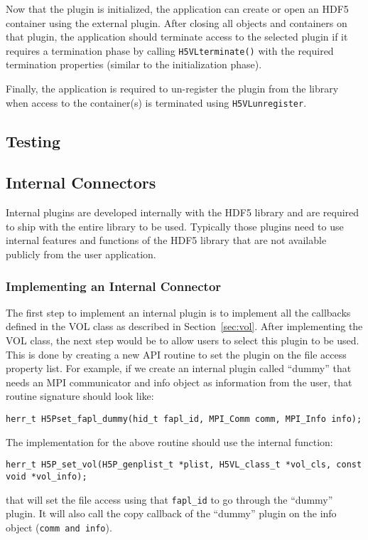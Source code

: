 Now that the plugin is initialized, the application can create or open an HDF5 container using the external plugin. After closing all objects and containers on that plugin, the application should terminate access to the selected plugin if it requires a termination phase by calling {\tt H5VLterminate()} with the required termination properties (similar to the initialization phase). 

Finally, the application is required to un-register the plugin from the library when access to the container(s) is terminated using {\tt H5VLunregister}.

\subsection{Testing}

\subsection{Internal Connectors}

Internal plugins are developed internally with the HDF5 library and
are required to ship with the entire library to be used. Typically
those plugins need to use internal features and functions of the HDF5
library that are not available publicly from the user application.

\subsubsection{Implementing an Internal Connector}
The first step to implement an internal plugin is to implement all the callbacks defined in the VOL class as described in Section~\ref{sec:vol}. After implementing the VOL class, the next step would be to allow users to select
this plugin to be used. This is done by creating a new API routine to
set the plugin on the file access property list. For example, if we
create an internal plugin called ``dummy'' that needs an MPI
communicator and info object as information from the user, that
routine signature should look like:

\begin{lstlisting}
herr_t H5Pset_fapl_dummy(hid_t fapl_id, MPI_Comm comm, MPI_Info info);
\end{lstlisting}

The implementation for the above routine should use the internal
function:
\begin{lstlisting}
herr_t H5P_set_vol(H5P_genplist_t *plist, H5VL_class_t *vol_cls, const
void *vol_info);
\end{lstlisting}
that will set the file access using that {\tt fapl\_id} to go through
the ``dummy'' plugin. It will also call the copy callback of the
``dummy'' plugin on the info object ({\tt comm and info}).

